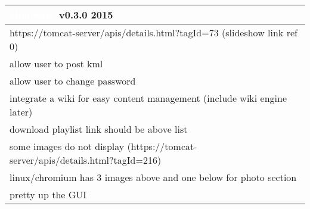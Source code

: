 \documentclass[notitlepage]{article}
\newcommand{\releasedate}{2015}
\begin{document}
\begin{center}
\begin{tabular}{ | l | }
\hline
\LARGE\cellcolor{myblue}\textcolor{white}{khallware} v0.3.0 \releasedate{} \\
\hline
https://tomcat-server/apis/details.html?tagId=73 (slideshow link ref 0) \\
\hline
allow user to post kml \\
\hline
allow user to change password \\
\hline
integrate a wiki for easy content management (include wiki engine later) \\
\hline
download playlist link should be above list \\
\hline
some images do not display (https://tomcat-server/apis/details.html?tagId=216) \\
\hline
linux/chromium has 3 images above and one below for photo section \\
\hline
pretty up the GUI \\
\hline

\end{tabular}
\end{center}
\end{document}
